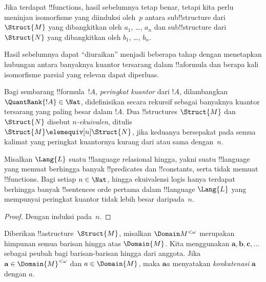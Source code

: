\documentclass[../../../include/open-logic-section]{subfiles}
\begin{document}
\begin{rem}
Jika terdapat !!{function}s, hasil sebelumnya tetap benar, tetapi kita perlu
meninjau isomorfisme yang diinduksi oleh~$p$ antara sub!!{structure} dari
$\Struct{M}$ yang dibangkitkan oleh $a_1$, \dots, $a_n$ dan
sub!!{structure} dari $\Struct{N}$ yang dibangkitkan oleh $b_1$, \dots,
$b_n$.
\end{rem}

Hasil sebelumnya dapat ``diuraikan'' menjadi beberapa tahap dengan menetapkan
hubungan antara banyaknya kuantor tersarang dalam !!a{formula} dan berapa kali
isomorfisme parsial yang relevan dapat diperluas.

\begin{defn}
  Bagi sembarang !!{formula}~$!A$, \emph{peringkat kuantor} dari $!A$,
  dilambangkan $\QuantRank{!A} \in \Nat$, didefinisikan secara rekursif
  sebagai banyaknya kuantor tersarang yang paling besar dalam $!A$. Dua
  !!{structure}s $\Struct{M}$ dan $\Struct{N}$ disebut
  \emph{$n$-ekuivalen}, ditulis $\Struct{M} \elemequiv[n] \Struct{N}$,
  jika keduanya bersepakat pada semua kalimat yang peringkat kuantornya kurang
  dari atau sama dengan~$n$.
\end{defn}

\begin{prop}
  Misalkan $\Lang{L}$ suatu !!{language} relasional hingga, yakni suatu
  !!{language} yang memuat berhingga banyak !!{predicate}s dan
  !!{constant}s, serta tidak memuat !!{function}s. Bagi setiap
  $n \in \Nat$, hingga ekuivalensi logis hanya terdapat berhingga banyak
  !!{sentence}s orde pertama dalam !!{language} $\Lang{L}$ yang mempunyai
  peringkat kuantor tidak lebih besar daripada~$n$.
\end{prop}

\begin{proof}
  Dengan induksi pada~$n$.
\end{proof}

\begin{defn}
  Diberikan !!a{structure}~$\Struct{M}$, misalkan $\Domain M^{<\omega}$
  merupakan himpunan semua barisan hingga atas $\Domain{M}$. Kita menggunakan
  $\mathbf{a}, \mathbf{b}, \mathbf{c}, \ldots$ sebagai peubah bagi
  barisan-barisan hingga dari anggota. Jika $\mathbf{a} \in
  \Domain{M}^{<\omega}$ dan $a \in \Domain{M}$, maka $\mathbf{a}a$
  menyatakan \emph{konkatenasi} $\mathbf{a}$ dengan $a$.
\end{defn}
\end{document}
